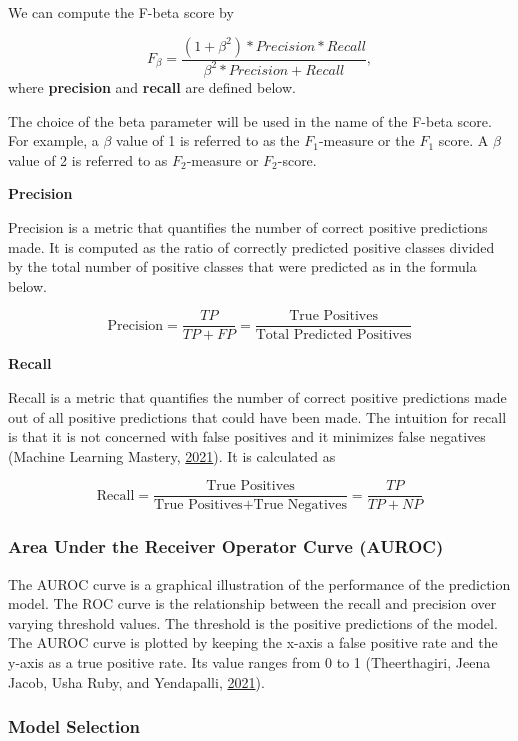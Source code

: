 \documentclass[
  10pt,
]{article}
\begin{document}
We can compute the F-beta score by

\[
  F_\beta = \frac{(1 + \beta^2) * Precision * Recall}{\beta^2 * Precision + Recall},
\]
where \textbf{precision} and \textbf{recall} are defined below.

The choice of the beta parameter will be used in the name of the F-beta score. For example, a \(\beta\) value of 1 is referred to as the \(F_1\)-measure or the \(F_1\) score. A \(\beta\) value of 2 is referred to as \(F_2\)-measure or \(F_2\)-score.

\textbf{Precision}

Precision is a metric that quantifies the number of correct positive predictions made. It is computed as the ratio of correctly predicted positive classes divided by the total number of positive classes that were predicted as in the formula below.

\[
\text{Precision} = \frac{TP}{TP + FP} = \frac{\text{True Positives}}{\text{Total Predicted Positives}}
\]

\textbf{Recall}

Recall is a metric that quantifies the number of correct positive predictions made out of all positive predictions that could have been made. The intuition for recall is that it is not concerned with false positives and it minimizes false negatives (Machine Learning Mastery, \protect\hyperlink{ref-MLM}{2021}). It is calculated as

\[
\text{Recall} = \frac{\text{True Positives}}{\text{True Positives} + \text{True Negatives}} = \frac{TP}{TP + NP}
\]

\hypertarget{area-under-the-receiver-operator-curve-auroc}{%
\subsubsection{Area Under the Receiver Operator Curve (AUROC)}\label{area-under-the-receiver-operator-curve-auroc}}

The AUROC curve is a graphical illustration of the performance of the prediction model. The
ROC curve is the relationship between the recall and precision over varying threshold values. The threshold is the positive predictions of the model. The AUROC curve is plotted by keeping the x-axis a false positive rate and the y-axis as a true positive rate. Its value ranges from 0 to 1 (Theerthagiri, Jeena Jacob, Usha Ruby, and Yendapalli, \protect\hyperlink{ref-theerthagiri2021prediction}{2021}).

\hypertarget{model-selection}{%
\subsubsection{Model Selection}\label{model-selection}}
\end{document}
